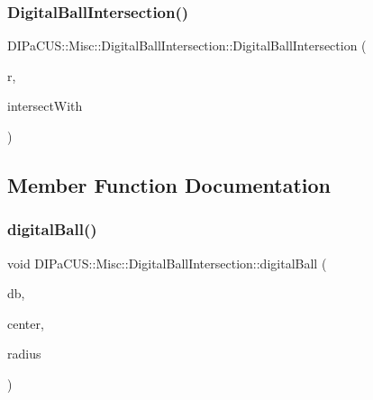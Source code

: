 \subsubsection{\texorpdfstring{Digital\+Ball\+Intersection()}{DigitalBallIntersection()}}
{\footnotesize\ttfamily D\+I\+Pa\+C\+U\+S\+::\+Misc\+::\+Digital\+Ball\+Intersection\+::\+Digital\+Ball\+Intersection (\begin{DoxyParamCaption}\item[{\mbox{\hyperlink{classDIPaCUS_1_1Misc_1_1DigitalBallIntersection_a8c17265617201b52046579d379b3e269}{Radius}}}]{r,  }\item[{const \mbox{\hyperlink{classDIPaCUS_1_1Misc_1_1DigitalBallIntersection_aaed19d165964a423d69f19a3de0d5587}{Digital\+Set}} \&}]{intersect\+With }\end{DoxyParamCaption})\hspace{0.3cm}{\ttfamily [inline]}}



\subsection{Member Function Documentation}
\mbox{\label{classDIPaCUS_1_1Misc_1_1DigitalBallIntersection_aa8e3d86381527972021df7a28cc373d3}} 
\subsubsection{\texorpdfstring{digital\+Ball()}{digitalBall()}}
{\footnotesize\ttfamily void D\+I\+Pa\+C\+U\+S\+::\+Misc\+::\+Digital\+Ball\+Intersection\+::digital\+Ball (\begin{DoxyParamCaption}\item[{\mbox{\hyperlink{classDIPaCUS_1_1Misc_1_1DigitalBallIntersection_aaed19d165964a423d69f19a3de0d5587}{Digital\+Set}} \&}]{db,  }\item[{\mbox{\hyperlink{classDIPaCUS_1_1Misc_1_1DigitalBallIntersection_a7e348073cb818df2e225d22746e1d6af}{Point}}}]{center,  }\item[{int}]{radius }\end{DoxyParamCaption})\hspace{0.3cm}{\ttfamily [inline]}}

